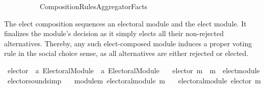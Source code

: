 \begin{isabellebody}
\ \ \ \ \ \ \ \ \ \ {\isachardoublequoteopen}{\isachardot}{\kern0pt}{\isachardot}{\kern0pt}{\isacharslash}{\kern0pt}{\isachardot}{\kern0pt}{\isachardot}{\kern0pt}{\isacharslash}{\kern0pt}Composition{\isacharunderscore}{\kern0pt}Rules{\isacharslash}{\kern0pt}Aggregator{\isacharunderscore}{\kern0pt}Facts{\isachardoublequoteclose}\isanewline
\isanewline
{}%
\endisatagtheory
{\isafoldtheory}%
%
\isadelimtheory
%
\endisadelimtheory
%
\isadelimdocument
%
\endisadelimdocument
%
\isatagdocument
%
\isamarkuptrue%
%
\endisatagdocument
{\isafolddocument}%
%
\isadelimdocument
%
\endisadelimdocument
%
\begin{isamarkuptext}%
The elect composition sequences an electoral module and the elect
module. It finalizes the module's decision as it simply elects all their
non-rejected alternatives. Thereby, any such elect-composed module induces
a proper voting rule in the social choice sense, as all alternatives are either
rejected or elected.%
\end{isamarkuptext}\isamarkuptrue%
%
\isadelimdocument
%
\endisadelimdocument
%
\isatagdocument
%
\isamarkuptrue%
%
\endisatagdocument
{\isafolddocument}%
%
\isadelimdocument
%
\endisadelimdocument
{}\isamarkupfalse%
\ elector\ {\isacharcolon}{\kern0pt}{\isacharcolon}{\kern0pt}\ {\isachardoublequoteopen}{\isacharprime}{\kern0pt}a\ Electoral{\isacharunderscore}{\kern0pt}Module\ {\isasymRightarrow}\ {\isacharprime}{\kern0pt}a\ Electoral{\isacharunderscore}{\kern0pt}Module{\isachardoublequoteclose}\ \isanewline
\ \ {\isachardoublequoteopen}elector\ m\ {\isacharequal}{\kern0pt}\ {\isacharparenleft}{\kern0pt}m\ {\isasymtriangleright}\ elect{\isacharunderscore}{\kern0pt}module{\isacharparenright}{\kern0pt}{\isachardoublequoteclose}%
\isadelimdocument
%
\endisadelimdocument
%
\isatagdocument
%
\isamarkuptrue%
%
\endisatagdocument
{\isafolddocument}%
%
\isadelimdocument
%
\endisadelimdocument
{}\isamarkupfalse%
\ elector{\isacharunderscore}{\kern0pt}sound{\isacharbrackleft}{\kern0pt}simp{\isacharbrackright}{\kern0pt}{\isacharcolon}{\kern0pt}\isanewline
\ \ \ module{\isacharunderscore}{\kern0pt}m{\isacharcolon}{\kern0pt}\ {\isachardoublequoteopen}electoral{\isacharunderscore}{\kern0pt}module\ m{\isachardoublequoteclose}\isanewline
\ \ \ {\isachardoublequoteopen}electoral{\isacharunderscore}{\kern0pt}module\ {\isacharparenleft}{\kern0pt}elector\ m{\isacharparenright}{\kern0pt}{\isachardoublequoteclose}\isanewline

\end{isabellebody}

